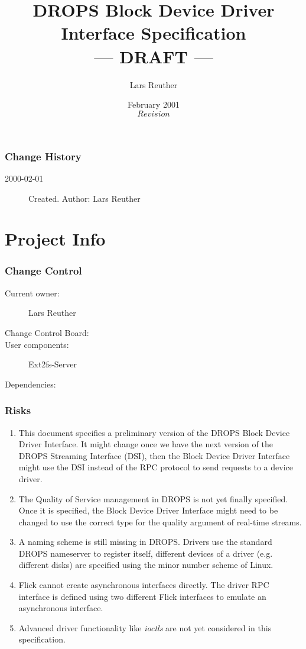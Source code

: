 \documentclass{article}
\title{DROPS Block Device Driver Interface Specification\\
--- DRAFT ---}
\author{Lars Reuther}
\date{February 2001 \\ \small $Revision$}
\begin{document}
\maketitle

\section*{Change History}

\begin{description}
\item[2000-02-01]
  Created. Author: Lars Reuther
\end{description}

\clearpage
\tableofcontents
\clearpage

\part{Project Info}

\section{Change Control}

\begin{description}
\item[Current owner:] Lars Reuther
\item[Change Control Board:] 
\item[User components:] Ext2fs-Server
\item[Dependencies:]
\end{description}

\section{Risks}

\begin{enumerate}
\item This document specifies a preliminary version of the DROPS Block 
  Device Driver Interface. It might change once we have the next version of 
  the DROPS Streaming Interface (DSI), then the Block Device Driver Interface 
  might use the DSI instead of the RPC protocol to send requests to a device
  driver.
\item The Quality of Service management in DROPS is not yet finally 
  specified. Once it is specified, the Block Device Driver Interface might
  need to be changed to use the correct type for the quality argument of 
  real-time streams.
\item A naming scheme is still missing in DROPS. Drivers use the standard 
  DROPS nameserver to register itself, different devices of a driver (e.g. 
  different disks) are specified using the minor number scheme of Linux.
\item Flick cannot create asynchronous interfaces directly. The driver RPC 
  interface is defined using two different Flick interfaces to emulate 
  an asynchronous interface.
\item Advanced driver functionality like \emph{ioctls} are not yet 
  considered in this specification.
\end{enumerate}
\end{document}
